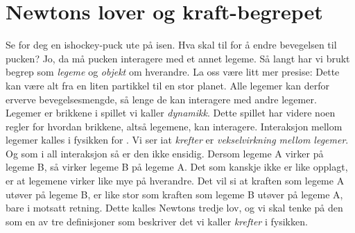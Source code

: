 

\section{Newtons lover og kraft-begrepet}
Se for deg en ishockey-puck ute på isen. Hva skal til for å endre bevegelsen til pucken? Jo, da må pucken interagere med et annet legeme. Så langt har vi brukt begrep som \textit{legeme} og \textit{objekt} om hverandre. La oss være litt mer presise:
Dette kan være alt fra en liten partikkel til en stor planet. Alle legemer kan derfor erverve bevegelsesmengde, så lenge de kan interagere med andre legemer. Legemer er brikkene i spillet vi kaller \textit{dynamikk}. Dette spillet har videre noen regler for hvordan brikkene, altså legemene, kan interagere. Interaksjon mellom legemer kalles i fysikken for . Vi ser iat \textit{krefter} er \textit{vekselvirkning mellom legemer}. Og som i all interaksjon så er den ikke ensidig. Dersom legeme A virker på legeme B, så virker legeme B på legeme A. Det som kanskje ikke er like opplagt, er at legemene virker like mye på hverandre. Det vil si at kraften som legeme A utøver på legeme B, er like stor som kraften som legeme B utøver på legeme A, bare i motsatt retning. Dette kalles Newtons tredje lov, og vi skal tenke på den som en av tre definisjoner som beskriver det vi kaller \textit{krefter} i fysikken.

